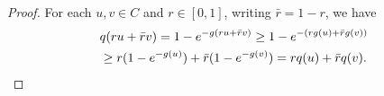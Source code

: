 \documentclass[12pt,a4paper]{amsart}
\numberwithin{equation}{section}
\theoremstyle{plain}
\theoremstyle{definition}
\begin{document}
\begin{proof}
For each $u,v \in C$ and $r \in [0,1]$, writing $\bar r = 1-r$, we have
\begin{align}
	&q(ru+\bar r v) 
  = 1 - e^{- g(ru + \bar r v)}
  \geq 1 - e^{- ( r g(u) + \bar r g(v))} \\
  & \geq r(1- e^{- g(u)}) + \bar r (1 - e^{- g(v)})
    = rq(u) + \bar r q(v).
    \qedhere
\end{align}	
\end{proof}



\end{document}
